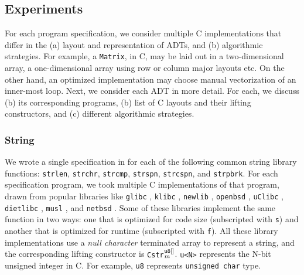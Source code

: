 

\subsection{Experiments}
For each \SpecL{} program specification, we consider multiple
C implementations that differ in the (a) layout and representation of ADTs, and
(b) algorithmic strategies. For example, a {\tt Matrix}, in C, may be laid out
in a two-dimensional array, a one-dimensional array using row or column major
layouts etc. On the other hand, an optimized implementation may choose manual vectorization
of an inner-most loop. Next, we consider each ADT in more detail. For each,
we discuss (b) its corresponding programs, (b) list of C layouts and their lifting
constructors, and (c) different algorithmic strategies.




\subsubsection{String} We wrote a single specification in \SpecL{} for each of the
following
common string library functions: {\tt strlen}, {\tt strchr}, {\tt strcmp}, {\tt strspn},
{\tt strcspn}, and {\tt strpbrk}.  For each specification
program, we took multiple C implementations of that program, drawn from popular
libraries like {\tt glibc} \cite{glibc}, {\tt klibc} \cite{klibc}, {\tt newlib} \cite{newlib},
{\tt openbsd} \cite{openbsdlibc}, {\tt uClibc} \cite{uclibc},
{\tt dietlibc} \cite{dietlibc}, {\tt musl} \cite{musl}, and {\tt netbsd} \cite{netbsd}.
Some of these libraries implement the same function in two ways: one that is optimized
for code size (subscripted with {\tt s}) and another that is optimized for runtime (subscripted with {\tt f}).
All these library implementations use a {\em null character} terminated array to represent
a string, and the
corresponding lifting constructor is {\tt Cstr}$^{\tt u8[]}_m$.
{\tt u<N>} represents the N-bit unsigned integer in C.
For example, {\tt u8} represents {\tt unsigned char} type.


